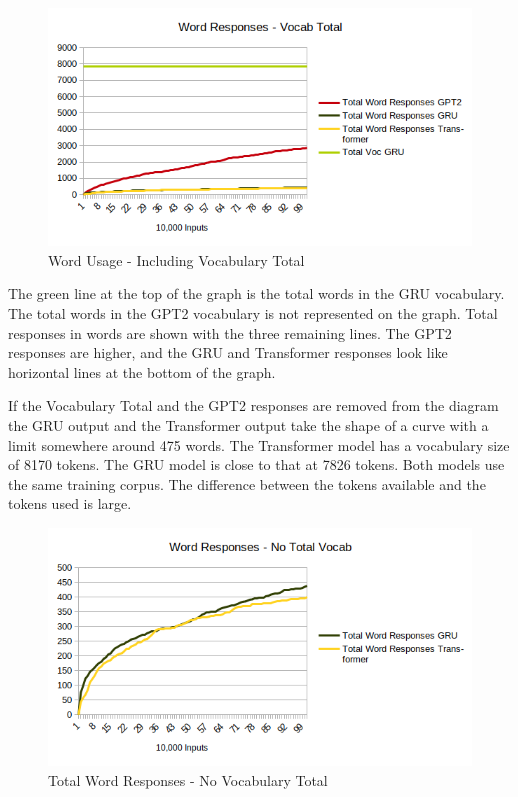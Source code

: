 \begin{figure}[H]
	\begin{center}
		\includegraphics[scale=0.75]{diagram-output-total-responses-01}
		
		
	\end{center}
	\caption[Word Usage]{Word Usage - Including Vocabulary Total}
	
	
\end{figure}

The green line at the top of the graph is the total words in the GRU vocabulary. The total words in the GPT2 vocabulary is not represented on the graph. Total responses in words are shown with the three remaining lines. The GPT2 responses are higher, and the GRU and Transformer responses look like horizontal lines at the bottom of the graph.

If the Vocabulary Total and the GPT2 responses are removed from the diagram the GRU output and the Transformer output take the shape of a curve with a limit somewhere around 475 words. The Transformer model has a vocabulary size of 8170 tokens. The GRU model is close to that at 7826 tokens. Both models use the same training corpus. The difference between the tokens available and the tokens used is large.


\begin{figure}[H]
	\begin{center}
		\includegraphics[scale=0.75]{diagram-output-total-responses-02}
		
		
	\end{center}
	\caption[Total Word Responses]{Total Word Responses - No Vocabulary Total}
	
	
\end{figure}

